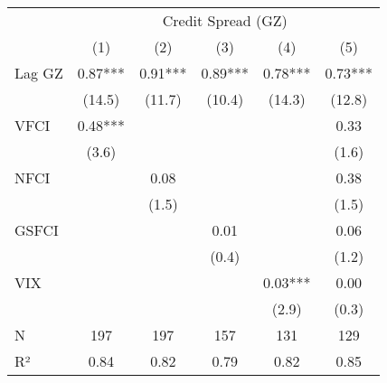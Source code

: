 \begingroup
\fontsize{12.0pt}{14.4pt}\selectfont
\begin{tabular}{lccccc}
\toprule
 & \multicolumn{5}{c}{Credit Spread (GZ)} \\ 
\cmidrule(lr){2-6}
  & (1) & (2) & (3) & (4) & (5) \\ 
\midrule\addlinespace[2.5pt]
Lag GZ & 0.87*** & 0.91*** & 0.89*** & 0.78*** & 0.73*** \\ 
 & (14.5) & (11.7) & (10.4) & (14.3) & (12.8) \\ 
VFCI & 0.48*** &  &  &  & 0.33 \\ 
 & (3.6) &  &  &  & (1.6) \\ 
NFCI &  & 0.08 &  &  & 0.38 \\ 
 &  & (1.5) &  &  & (1.5) \\ 
GSFCI &  &  & 0.01 &  & 0.06 \\ 
 &  &  & (0.4) &  & (1.2) \\ 
VIX &  &  &  & 0.03*** & 0.00 \\ 
{} & {} & {} & {} & {(2.9)} & {(0.3)} \\ 
\midrule\addlinespace[2.5pt]
  N & 197 & 197 & 157 & 131 & 129 \\ 
R² & 0.84 & 0.82 & 0.79 & 0.82 & 0.85 \\ 
\bottomrule
\end{tabular}
\endgroup

